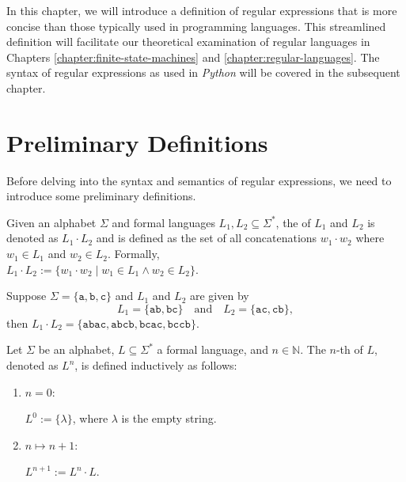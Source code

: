 In this chapter, we will introduce a definition of regular expressions that is more concise than those
typically used in programming languages. This streamlined definition will facilitate our theoretical
examination of regular languages in Chapters \ref{chapter:finite-state-machines} and
\ref{chapter:regular-languages}. The syntax of regular expressions as used in \textsl{Python} will be covered
in the subsequent chapter. 

\section{Preliminary Definitions}
Before delving into the syntax and semantics of regular expressions, we need to introduce some preliminary definitions.

\begin{Definition}
  Given an alphabet $\Sigma$ and formal languages $ L_1, L_2 \subseteq \Sigma^* $, the
   of $ L_1 $ and $ L_2 $ is denoted as $ L_1 \cdot L_2 $ and
  is defined as the set of all concatenations $ w_1 \cdot w_2 $ where $ w_1 \in L_1 $ and $ w_2 \in L_2
  $. Formally,  
\\[0.2cm]
\hspace*{1.3cm}
$ L_1 \cdot L_2 := \{ w_1 \cdot w_2 \mid w_1 \in L_1 \land w_2 \in L_2 \}$. \eox 
\end{Definition}

\exampleEng
Suppose $ \Sigma = \{ \texttt{a}, \texttt{b}, \texttt{c} \} $ and $ L_1 $ and $ L_2 $ are given by
\[
L_1 = \{ \texttt{ab}, \texttt{bc} \} \quad \text{and} \quad L_2 = \{ \texttt{ac}, \texttt{cb} \},
\]
then $ L_1 \cdot L_2 = \{ \texttt{abac}, \texttt{abcb}, \texttt{bcac}, \texttt{bccb} \} $. \eox


\begin{Definition}
Let $ \Sigma $ be an alphabet, $ L \subseteq \Sigma^* $ a formal language, and $ n \in \mathbb{N} $. The $ n $-th  of $ L $, denoted as $ L^n $, is defined inductively as follows:
\begin{enumerate}
\item[B.C.:] $ n = 0 $:

             $ L^0 := \{ \lambda \} $, \quad where $ \lambda $ is the empty string.
\item[I.S.:] $ n \mapsto n + 1 $:
             
             $ L^{n+1} := L^n \cdot L $. \eox
\end{enumerate}
\end{Definition}

